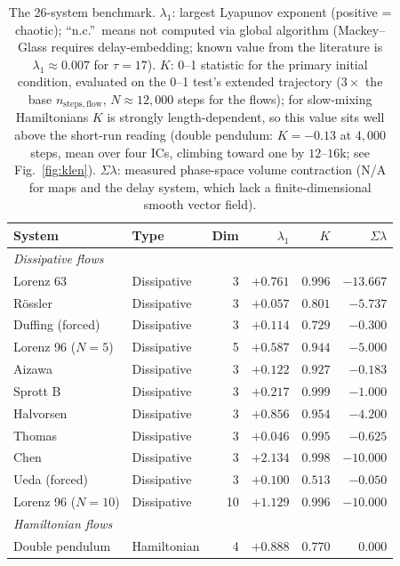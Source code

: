 \documentclass[11pt]{article}
\begin{document}
\begin{table}[ht]
\centering
\small
\caption{The 26-system benchmark. $\lambda_1$: largest Lyapunov exponent (positive
= chaotic); ``n.c.''\ means not computed via global algorithm (Mackey--Glass
requires delay-embedding; known value from the literature is $\lambda_1\approx0.007$
for $\tau=17$). $K$: 0--1 statistic for the primary initial condition, evaluated on the 0--1
test's extended trajectory ($3\times$ the base $n_{\mathrm{steps,flow}}$,
$N\approx12{,}000$ steps for the flows); for slow-mixing Hamiltonians $K$ is
strongly length-dependent, so this value sits well above the short-run reading
(double pendulum: $K=-0.13$ at $4{,}000$ steps, mean over four ICs, climbing
toward one by $12$--$16$k; see Fig.~\ref{fig:klen}). $\Sigma\lambda$: measured
phase-space volume contraction (N/A for maps and the delay system, which lack a
finite-dimensional smooth vector field).}
\label{tab:systems}
\begin{tabular}{llr r r r}
\toprule
System & Type & Dim & $\lambda_1$ & $K$ & $\Sigma\lambda$ \\
\midrule
\multicolumn{6}{l}{\textit{Dissipative flows}} \\
Lorenz 63          & Dissipative & 3  & $+0.761$ & $0.996$ & $-13.667$ \\
R\"{o}ssler        & Dissipative & 3  & $+0.057$ & $0.801$ & $-5.737$  \\
Duffing (forced)   & Dissipative & 3  & $+0.114$ & $0.729$ & $-0.300$  \\
Lorenz 96 ($N=5$)  & Dissipative & 5  & $+0.587$ & $0.944$ & $-5.000$  \\
Aizawa             & Dissipative & 3  & $+0.122$ & $0.927$ & $-0.183$  \\
Sprott B           & Dissipative & 3  & $+0.217$ & $0.999$ & $-1.000$  \\
Halvorsen          & Dissipative & 3  & $+0.856$ & $0.954$ & $-4.200$  \\
Thomas             & Dissipative & 3  & $+0.046$ & $0.995$ & $-0.625$  \\
Chen               & Dissipative & 3  & $+2.134$ & $0.998$ & $-10.000$ \\
Ueda (forced)      & Dissipative & 3  & $+0.100$ & $0.513$ & $-0.050$  \\
Lorenz 96 ($N=10$) & Dissipative & 10 & $+1.129$ & $0.996$ & $-10.000$ \\
\midrule
\multicolumn{6}{l}{\textit{Hamiltonian flows}} \\
Double pendulum          & Hamiltonian & 4 & $+0.888$ & $0.770$ & $0.000$ \\

\end{tabular}
\end{table}
\end{document}
